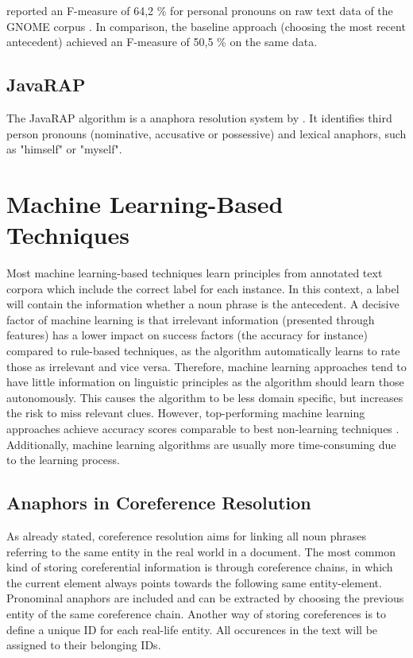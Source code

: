 \citep{poesio2004mate} reported an F-measure of 64,2 \% for personal pronouns on raw text data of the GNOME corpus \citep{poesio2004general}. In comparison, the baseline approach (choosing the most recent antecedent) achieved an F-measure of 50,5 \% on the same data.


\subsection{JavaRAP}
The JavaRAP algorithm is a anaphora resolution system by \citep{qiu2004public}. It identifies third person pronouns (nominative, accusative or possessive) and lexical anaphors, such as "himself" or "myself".

\section{Machine Learning-Based Techniques}

Most machine learning-based techniques learn principles from annotated text corpora \citep{soon2001machine, bergsma2005automatic} which include the correct label for each instance. In this context, a label will contain the information whether a noun phrase is the antecedent. A decisive factor of machine learning is that irrelevant information (presented through features) has a lower impact on success factors (the accuracy for instance) compared to rule-based techniques, as the algorithm automatically learns to rate those as irrelevant and vice versa. Therefore, machine learning approaches tend to have little information on linguistic principles as the algorithm should learn those autonomously. This causes the algorithm to be less domain specific, but increases the risk to miss relevant clues. However, top-performing machine learning approaches achieve accuracy scores comparable to best non-learning techniques \citep{soon2001machine}. \\
Additionally, machine learning algorithms are usually more time-consuming due to the learning process.

\subsection{Anaphors in Coreference Resolution}
\label{soon2001traininginstances} %

As already stated, coreference resolution aims for linking all noun phrases referring to the same entity in the real world in a document. The most common kind of storing coreferential information is through coreference chains, in which the current element always points towards the following same entity-element. Pronominal anaphors are included and can be extracted by choosing the previous entity of the same coreference chain. Another way of storing coreferences is to define a unique ID for each real-life entity. All occurences in the text will be assigned to their belonging IDs.

